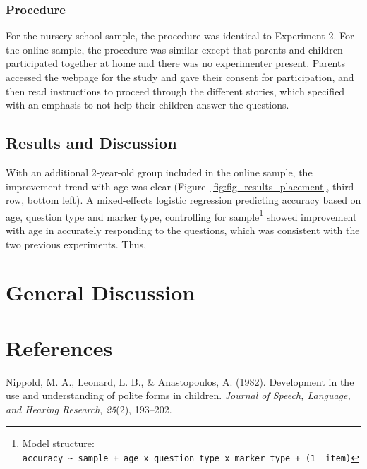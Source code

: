 \documentclass[10pt, letterpaper]{article}
\begin{document}
\subsubsection{Procedure}\label{procedure-2}

For the nursery school sample, the procedure was identical to Experiment
2. For the online sample, the procedure was similar except that parents
and children participated together at home and there was no experimenter
present. Parents accessed the webpage for the study and gave their
consent for participation, and then read instructions to proceed through
the different stories, which specified with an emphasis to not help
their children answer the questions.

\subsection{Results and Discussion}\label{results-and-discussion-2}

With an additional 2-year-old group included in the online sample, the
improvement trend with age was clear
(Figure~\ref{fig:fig_results_placement}, third row, bottom left). A
mixed-effects logistic regression predicting accuracy based on age,
question type and marker type, controlling for sample\footnote{Model
  structure:
  \texttt{accuracy\ \textasciitilde{}\ sample\ +\ age\ x\ question\ type\ x\ marker\ type\ +\ (1\ \textbar{}\ item)}}
showed improvement with age in accurately responding to the questions,
which was consistent with the two previous experiments. Thus,

\section{General Discussion}\label{general-discussion}

\section{References}\label{references}

\setlength{\parindent}{-0.1in} \setlength{\leftskip}{0.125in} \noindent

\hypertarget{refs}{}
\hypertarget{ref-nippold1982}{}
Nippold, M. A., Leonard, L. B., \& Anastopoulos, A. (1982). Development
in the use and understanding of polite forms in children. \emph{Journal
of Speech, Language, and Hearing Research}, \emph{25}(2), 193--202.
\end{document}
